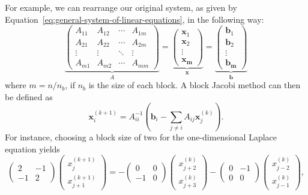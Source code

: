 For example, we can rearrange our original system, as given by Equation~\eqref{eq:general-system-of-linear-equations}, in the following way:
\begin{equation}
\underbrace{
\begin{pmatrix}A_{11}&A_{12}&\cdots &A_{1m}\\A_{21}&A_{22}&\cdots &A_{2m}\\\vdots &\vdots &\ddots &\vdots \\A_{m1}&A_{m2}&\cdots &A_{mm}\end{pmatrix}}_{A}
 = 
\underbrace{
\begin{pmatrix}
\bm{x}_1 \\ \bm{x}_2 \\ \vdots \\ \bm{x_m} 
\end{pmatrix}}_{\bm{x}} =
\underbrace{
\begin{pmatrix}
	\bm{b}_1 \\ \bm{b}_2 \\ \vdots \\ \bm{b_m} 
\end{pmatrix}}_{\bm{b}}
\end{equation}
where $m = n / n_b$, if $n_b$ is the size of each block.
A block Jacobi method can then be defined as
\begin{equation}
	\bm{x}_{i}^{(k+1)}=A_{ii}^{-1}\left(\bm{b}_{i}-\sum _{j\neq i}A_{ij}\bm{x}_{j}^{(k)}\right).
	\label{eq:jacobi-block-wise}
\end{equation}
For instance, choosing a block size of two for the one-dimensional Laplace equation yields
\begin{equation}
	\begin{pmatrix}
		2 & -1 \\
		-1 & 2
	\end{pmatrix}
	\begin{pmatrix}
		x_{j}^{(k+1)} \\ x_{j+1}^{(k+1)} 
	\end{pmatrix}
= 	-  \begin{pmatrix}
	0 & 0 \\
	-1 & 0
\end{pmatrix} 	
\begin{pmatrix}
x_{j+2}^{(k)} \\ x_{j+3}^{(k)}
\end{pmatrix} -
\begin{pmatrix}
	0 & -1 \\
	0 & 0
\end{pmatrix} 	
\begin{pmatrix}
	x_{j-2}^{(k)} \\ x_{j-1}^{(k)} 
\end{pmatrix},
\end{equation}

